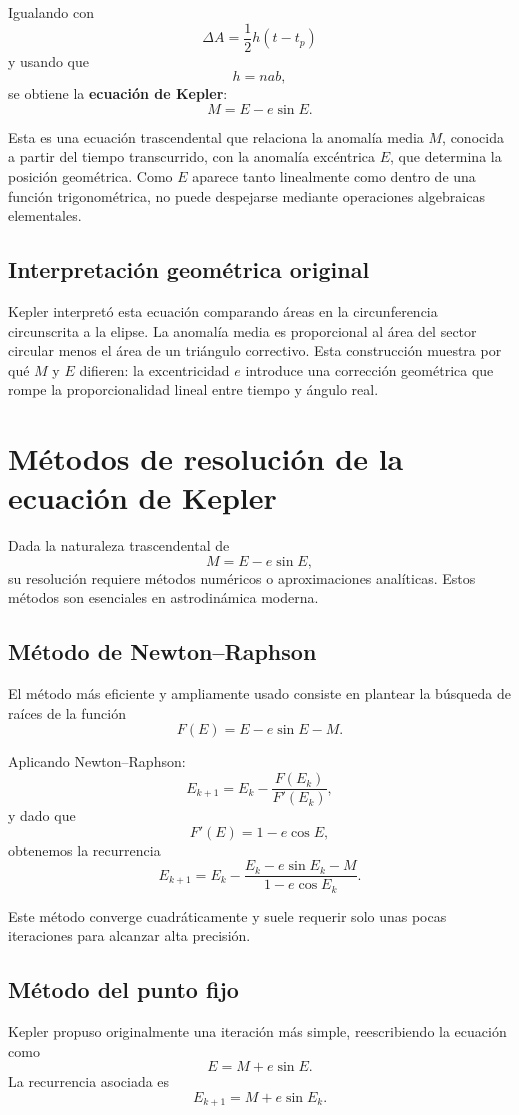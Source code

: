 Igualando con
\[
\Delta A = \frac{1}{2}h(t-t_p)
\]
y usando que
\[
 h = nab,
\]
se obtiene la \textbf{ecuación de Kepler}:
\[
 M = E - e\sin E.
\]

Esta es una ecuación trascendental que relaciona la anomalía media \(M\), conocida a partir del tiempo transcurrido, con la anomalía excéntrica \(E\), que determina la posición geométrica. Como \(E\) aparece tanto linealmente como dentro de una función trigonométrica, no puede despejarse mediante operaciones algebraicas elementales.

\subsection{Interpretación geométrica original}
Kepler interpretó esta ecuación comparando áreas en la circunferencia circunscrita a la elipse. La anomalía media es proporcional al área del sector circular menos el área de un triángulo correctivo. Esta construcción muestra por qué \(M\) y \(E\) difieren: la excentricidad \(e\) introduce una corrección geométrica que rompe la proporcionalidad lineal entre tiempo y ángulo real.

\section{Métodos de resolución de la ecuación de Kepler}
Dada la naturaleza trascendental de
\[
 M = E - e\sin E,
\]
su resolución requiere métodos numéricos o aproximaciones analíticas. Estos métodos son esenciales en astrodinámica moderna.

\subsection{Método de Newton--Raphson}
El método más eficiente y ampliamente usado consiste en plantear la búsqueda de raíces de la función
\[
 F(E) = E - e\sin E - M.
\]

Aplicando Newton--Raphson:
\[
 E_{k+1} = E_k - \frac{F(E_k)}{F'(E_k)},
\]
y dado que
\[
 F'(E) = 1 - e\cos E,
\]
obtenemos la recurrencia
\[
 E_{k+1} = E_k - \frac{E_k - e\sin E_k - M}{1 - e\cos E_k}.
\]

Este método converge cuadráticamente y suele requerir solo unas pocas iteraciones para alcanzar alta precisión.

\subsection{Método del punto fijo}
Kepler propuso originalmente una iteración más simple, reescribiendo la ecuación como
\[
 E = M + e\sin E.
\]
La recurrencia asociada es
\[
 E_{k+1} = M + e\sin E_k.
\]

